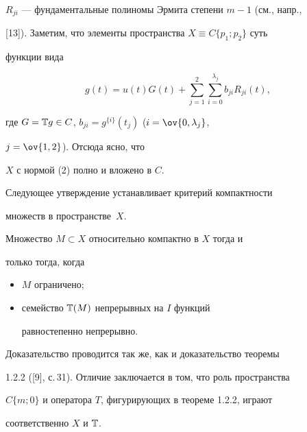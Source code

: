 $R_{j i}$ --- фундаментальные полиномы Эрмита степени $m-1$ (см., напр., 


[13]). Заметим, что элементы пространства $X\equiv C\{p_1;p_2\}$ суть 


функции вида 


\begin{equation} 


g(t)=u(t)G(t)+\sum^2_{j=1}\sum^{\lambda_j}_{i=0}b_{j i}R_{j i}(t), 


\end{equation} 


где $G=\Bbb T g\in C$, $b_{j i}=g^{\{i\}}(t_j)$ ($i=\ov{0,\lambda_j}$, 


$j=\ov{1,2}$). Отсюда ясно, что 


$X$ с нормой (2) полно и вложено в $C$. 


 


Следующее утверждение устанавливает критерий компактности 


множеств в пространстве~$X$. 


 


\begin{thm} 


Множество $M\subset X$ относительно компактно в $X$ тогда и 


только тогда, когда 


\begin{itemize} 


\item[(i)] $M$ ограничено\/$;$


\item[(ii)] семейство $\Bbb T(M)$ непрерывных на $I$ функций 


равностепенно непрерывно. 


\end{itemize} 


\end{thm} 


 


Доказательство проводится так же, как и доказательство теоремы 


1.2.2 ([9], с.\,31). Отличие заключается в том, что роль пространства 


$C\{m;0\}$ и оператора $T$, фигурирующих в теореме 1.2.2, играют 


соответственно $X$ и $\Bbb T$. 


